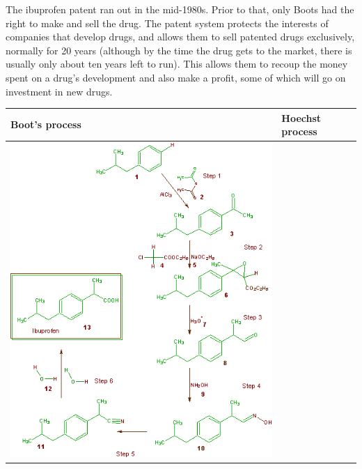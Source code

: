 \documentclass[pdftex,11pt,a4paper]{article}
\begin{document}
The ibuprofen patent ran out in the mid-1980s. Prior to that, only Boots had the right
to make and sell the drug. The patent system protects the interests of companies that
develop drugs, and allows them to sell patented drugs exclusively, normally for 20
years (although by the time the drug gets to the market, there is usually only about
ten years left to run). This allows them to recoup the money spent on a drug’s
development and also make a profit, some of which will go on investment in new
drugs.\\

\hspace{-25pt}\begin{tabular}{|p{235pt}|p{175pt}|}
\hline
Boot's process & Hoechst process\\
\hline
\includegraphics[clip=true,trim=0pt 0pt 0pt 0pt,scale=0.5]{ib2.png}&

\end{tabular}
\end{document}
